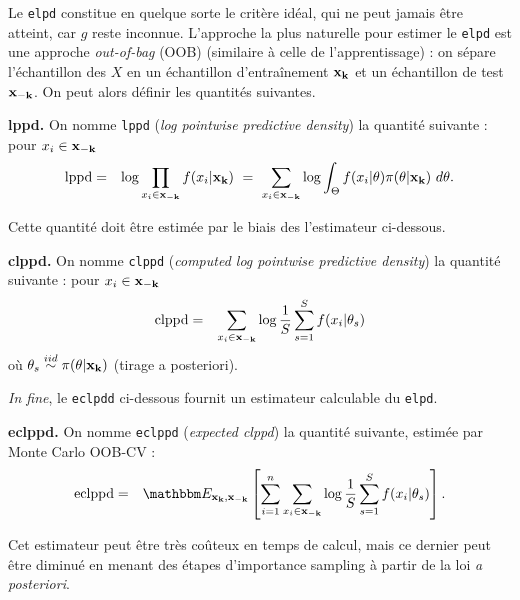 Le \texttt{elpd} constitue en quelque sorte le critère idéal, qui ne peut jamais être atteint, car $g$ reste inconnue. L'approche la plus naturelle pour estimer le \texttt{elpd} est une approche  \emph{out-of-bag} (OOB) (similaire à celle de l'apprentissage) : on sépare l'échantillon des $X$ en un échantillon d'entraînement ${\bf x_k}$ et un échantillon de test $\bf x_{-k}$. On peut alors définir les quantités suivantes. 

\begin{definition}{\bf lppd.}
On nomme \texttt{lppd} ({\it log pointwise predictive density}) la quantité suivante : pour $x_i \in {\bf x_{-k}}$
\begin{eqnarray*}
\mbox{lppd} & = & \log \prod\limits_{x_i \in {\bf x_{-k}}}  f(x_i|{\bf x_k})  \ = \  \sum\limits_{x_i \in {\bf x_{-k}}} \log \int_{\Theta} f(x_i|\theta) \pi(\theta|{\bf x_k}) \ d\theta.  
\end{eqnarray*}
\end{definition}

Cette quantité doit être estimée par le biais des l'estimateur ci-dessous.

\begin{definition}{\bf clppd.}
On nomme \texttt{clppd} ({\it computed log pointwise predictive density}) la quantité suivante : pour $x_i \in {\bf x_{-k}}$
\begin{eqnarray*}
\mbox{clppd} & = & \sum\limits_{x_i \in {\bf x_{-k}}} \log \frac{1}{S} \sum\limits_{s=1}^S  f(x_i|\theta_s) 
\end{eqnarray*}
où $\theta_s\overset{iid}{\sim}\pi(\theta|{\bf x_k})$ (tirage a posteriori).
\end{definition}

{\it In fine}, le \texttt{eclpdd} ci-dessous fournit un estimateur calculable du \texttt{elpd}. 

\begin{definition}{\bf eclppd.}
On nomme \texttt{eclppd} ({\it expected clppd}) la quantité suivante, estimée par Monte Carlo OOB-CV :
\begin{eqnarray*}
\mbox{eclppd} & = & \E_{{\bf x_k},{\bf x_{-k}}}\left[\sum\limits_{i=1}^n \sum\limits_{x_i \in {\bf x_{-k}}} \log \frac{1}{S} \sum\limits_{s=1}^S  f(x_i|\theta_s)\right]. 
\end{eqnarray*}
\end{definition}

Cet estimateur peut être très coûteux en temps de calcul, mais ce dernier peut être diminué en menant des étapes d'importance sampling à partir de la loi {\it a posteriori}. 

